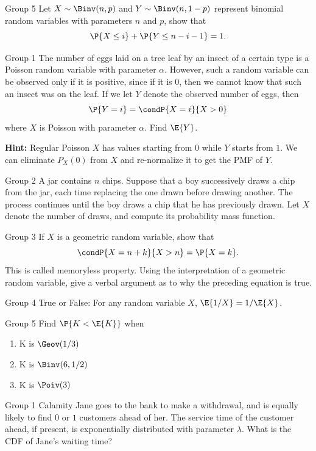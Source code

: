 \documentclass{article}
\theoremstyle{plain}
\theoremstyle{definition}
\theoremstyle{remark}
\begin{document}
\begin{problem}
    {Group 5}
    Let $X\sim\Binv(n,p)$ and $Y\sim\Binv(n,1-p)$ represent binomial random variables with parameters $n$ and $p$, show that
    \[\P{X\leq i}+\P{Y\leq n-i-1}=1.\]
\end{problem}
\begin{problem}
    {Group 1}
    The number of eggs laid on a tree leaf by an insect of a certain type is a Poisson random variable with parameter $\alpha$. However, such a random variable can be observed only if it is positive, since if it is $0$, then we cannot know that such an insect was on the leaf. If we let $Y$ denote the observed number of eggs, then
    \[\P{Y=i}=\condP{X=i}{X>0}\]
    where $X$ is Poisson with parameter $\alpha$. Find $\E{Y}$.

    \textbf{Hint:} Regular Poisson $X$ has values starting from $0$ while $Y$ starts from $1$. We can eliminate $P_X(0)$ from $X$ and re-normalize it to get the PMF of $Y$.
\end{problem}

\begin{problem}
    {Group 2}
    A jar contains $n$ chips. Suppose that a boy successively draws a chip from the jar, each time replacing the one drawn before drawing another. The process continues until the boy draws a chip that he has previously drawn. Let $X$ denote the number of draws, and compute its probability mass function.
\end{problem}

\begin{problem}
    {Group 3}
    If $X$ is a geometric random variable, show that
    \[\condP{X = n + k}{X > n} = \P{X = k}.\]
    This is called memoryless property. Using the interpretation of a geometric random variable, give a verbal argument as to why the preceding equation is true.
\end{problem}

\begin{problem}
    {Group 4}
    True or False: For any random variable $X$, $\E{1/X}=1/\E{X}$.
\end{problem}

\begin{problem}
    {Group 5}
    Find $\P{K<\E{K}}$ when
    \begin{enumerate}
        \item K is $\Geov(1/3)$
        \item K is $\Binv(6, 1/2)$
        \item K is $\Poiv(3)$
    \end{enumerate}
\end{problem}
\begin{problem}
    {Group 1}
    Calamity Jane goes to the bank to make a withdrawal, and is equally likely to find $0$ or $1$ customers ahead of her. The service time of the customer ahead, if present, is exponentially distributed with parameter $\lambda$. What is the CDF of Jane's waiting time?
\end{problem}
\end{document}
